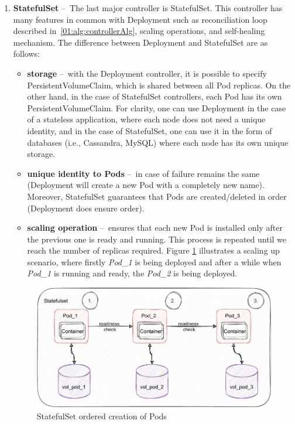 \begin{enumerate}
    \item \textbf{StatefulSet} \---\ The last major controller is StatefulSet.
    This controller has many features in common with Deployment such as reconciliation loop described in~\ref{01:alg:controllerAlg}, scaling operations, and self-healing mechanism.
    The difference between Deployment and StatefulSet are as follows:
    \begin{itemize}
        \item \textbf{storage} \---\ with the Deployment controller, it is possible to specify PersistentVolumeClaim, which is shared between all Pod replicas.
        On the other hand, in the case of StatefulSet controllers, each Pod has its own PersistentVolumeClaim.
        For clarity, one can use Deployment in the case of a stateless application, where each node does not need a unique identity, and in the case of StatefulSet, one can use it in the form of databases (i.e., Cassandra, MySQL) where each node has its own unique storage.
        \item \textbf{unique identity to Pods} \---\ in case of failure remains the same (Deployment will create a new Pod with a completely new name).
        Moreover, StatefulSet guarantees that Pods are created/deleted in order (Deployment does ensure order).
        \item \textbf{scaling operation} \---\  ensures that each new Pod is installed only after the previous one is ready and running.
        This process is repeated until we reach the number of replicas required.
        Figure \ref{02:fig:statefulsetOrderedCreation} illustrates a scaling up scenario, where firstly \emph{Pod\_1} is being deployed and after a while when \emph{Pod\_1} is running and ready, the \emph{Pod\_2} is being deployed.
    \end{itemize}

    \begin{figure}[!h]
        \centering
        \includegraphics[scale=1]{obrazky-figures/02-preliminaries/01-kubernetes/04-statefuset_with_volume}
        \caption{StatefulSet ordered creation of Pods}
        \label{02:fig:statefulsetOrderedCreation}
    \end{figure}


\end{enumerate}
